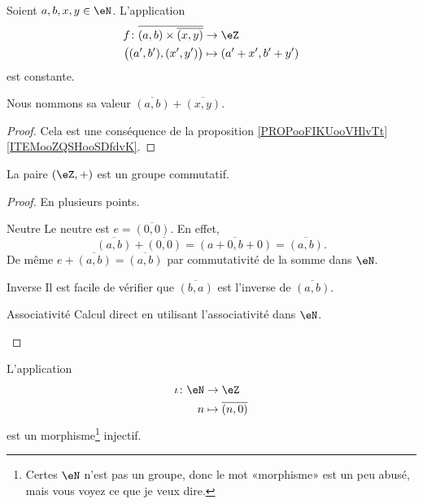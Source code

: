 \begin{propositionDef}
    Soient \( a,b,x,y\in \eN\). L'application
    \begin{equation}
        \begin{aligned}
            f\colon \overline{ (a,b)\times \overline{ (x,y) } }&\to \eZ \\
            \big( (a',b'),(x',y') \big)&\mapsto (a'+x',b'+y') 
        \end{aligned}
    \end{equation}
    est constante.

    Nous nommons sa valeur \( \overline{ (a,b) }+\overline{ (x,y) }\).
\end{propositionDef}

\begin{proof}
    Cela est une conséquence de la proposition \ref{PROPooFIKUooVHlvTt}\ref{ITEMooZQSHooSDfdvK}.
\end{proof}


\begin{proposition}
    La paire \( (\eZ,+)\) est un groupe commutatif.
\end{proposition}

\begin{proof}
    En plusieurs points.
    \begin{subproof}
    \item[Neutre]
        Le neutre est \( e=\overline{ (0,0) }\). En effet,
        \begin{equation}
            \overline{ (a,b) }+\overline{ (0,0) }=\overline{ (a+0,b+0) }=\overline{ (a,b) }.
        \end{equation}
        De même \( e+\overline{ (a,b) }=\overline{ (a,b) }\) par commutativité de la somme dans \( \eN\).
    \item[Inverse]
        Il est facile de vérifier que \( \overline{ (b,a) }\) est l'inverse de \( \overline{ (a,b) }\).
    \item[Associativité]
        Calcul direct en utilisant l'associativité dans \( \eN\).
    \end{subproof}
\end{proof}


\begin{proposition}
    L'application
    \begin{equation}
        \begin{aligned}
            \iota\colon \eN&\to \eZ \\
            n&\mapsto \overline{ (n,0) } 
        \end{aligned}
    \end{equation}
    est un morphisme\footnote{Certes \( \eN\) n'est pas un groupe, donc le mot «morphisme» est un peu abusé, mais vous voyez ce que je veux dire.} injectif.
\end{proposition}

